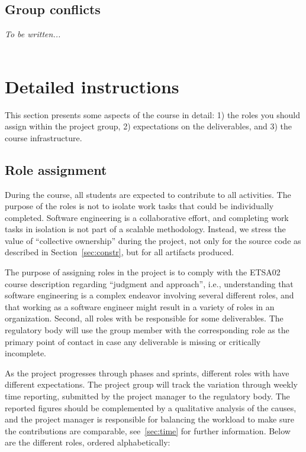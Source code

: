 \documentclass{scrreprt}
\begin{document}
\section{Group conflicts}
\emph{To be written...}\\\\

\chapter{Detailed instructions}
This section presents some aspects of the course in detail: 1) the roles you should assign within the project group, 2) expectations on the deliverables, and 3) the course infrastructure.

\section{Role assignment} \label{sec:roles} %
During the course, all students are expected to contribute to all activities. The purpose of the roles is not to isolate work tasks that could be individually completed. Software engineering is a collaborative effort, and completing work tasks in isolation is not part of a scalable methodology. Instead, we stress the value of ``collective ownership'' during the project, not only for the source code as described in Section~\ref{sec:constr}, but for all artifacts produced.

The purpose of assigning roles in the project is to comply with the ETSA02 course description regarding ``judgment and approach'', i.e., understanding that software engineering is a complex endeavor involving several different roles, and that working as a software engineer might  result in a variety of roles in an organization. Second, all roles with be responsible for some deliverables. The regulatory body will use the group member with the corresponding role as the primary point of contact in case any deliverable is missing or critically incomplete.

As the project progresses through phases and sprints, different roles with have different expectations. The project group will track the variation through weekly time reporting, submitted by the project manager to the regulatory body. The reported figures should be complemented by a qualitative analysis of the causes, and the project manager is responsible for balancing the workload to make sure the contributions are comparable, see~\ref{sec:time} for further information. Below are the different roles, ordered alphabetically:
\end{document}
